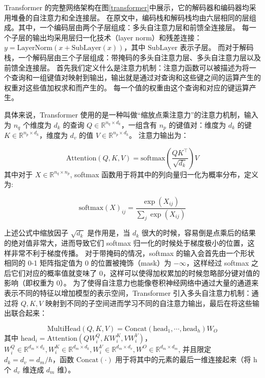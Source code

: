 Transformer 的完整网络架构在图\ref{transformer}中展示，它的解码器和编码器均采用堆叠的自注意力和全连接层。
在原文中，编码栈和解码栈均由六层相同的层组成。其中，一个编码层由两个子层组成：多头自注意力层和前馈全连接层。
每一个子层的输出均采用层归一化技术（layer norm）和残差连接：$y = \text{LayerNorm}(x + \text{SubLayer}(x))$，其中 $\text{SubLayer}$ 表示子层。
而对于解码栈，一个解码层由三个子层组成：带掩码的多头自注意力层、多头自注意力层以及前馈全连接层。
首先我们定义什么是注意力机制：注意力函数可以被描述为将一个查询和一组键值对映射到输出，输出就是通过对查询和这些键之间的运算产生的权重对这些值加权求和而产生的。
每一个值的权重由这个查询和对应的键运算产生。

具体来说，Transformer 使用的是一种叫做“缩放点乘注意力”的注意力机制，输入为 $n_q$ 个维度为 $d_k$ 的查询 $Q \in \mathbb{R}^{n_q \times d_k}$，一组含有 $n_p$ 的键值对：维度为 $d_k$ 的键 $K \in \mathbb{R}^{n_p \times d_k}$，维度为 $d_v$ 的值 $V \in \mathbb{R}^{n_p \times d_k}$。
注意力输出为：

\begin{equation}
	\text{Attention} (Q, K, V) = \text{softmax}(\frac{QK^\top}{\sqrt{d_k}}) V
\end{equation}
其中对于 $X \in \mathbb{R}^{n_q \times n_p}$, softmax 函数用于将其中的列向量归一化为概率分布，定义为:

\begin{equation}
	\text{softmax}(X)_{ij} = \frac{\exp(X_{ij})}{\sum_j \exp(X_{ij})}
\end{equation}

上述公式中缩放因子 $\sqrt{d_k}$ 是作用是，当 $d_k$ 很大的时候，容易倒是点乘后的结果的绝对值非常大，进而导致它们 softmax 归一化的时候处于梯度极小的位置，这样非常不利于梯度传播。
对于带掩码的情况，softmax 的输入会首先由一个形状相同的 0-1 矩阵指定值为 0 的位置被掩饰（mask）为 $-\infty$，这样经过 softmax 之后它们对应的概率值就变味了 $0$，这样可以使得加权累加的时候忽略部分键对值的影响（即权重为 0）。
为了使得自注意力也能像卷积神经网络中通过大量的通道来表示不同的特征以增加模型的表示空间，Transformer 引入多头自注意力机制：通过将 $Q,K,V$ 映射到不同的子空间进而学习不同的自注意力输出，最后在将这些输出联合起来：

\begin{equation}
	\text{MultiHead}(Q,K,V) = \text{Concat}(\text{head}_1,\cdots,\text{head}_h) W_O
\end{equation}
其中 $\text{head}_i = \text{Attention}(Q W_i^Q, KW_i^K, VW_i^V)$，$W_i^Q \in \mathbb{R}^{d_m \times d_k}, W_i^K \in \mathbb{R}^{d_m \times d_k}, W_i^V \in \mathbb{R}^{d_m \times d_v}, W^O \in \mathbb{R}^{d_m \times d_m}$, 并且限定 $d_k = d_v = d_m / h$，函数 $\text{Concat}(\cdot)$ 用于将其中的元素的最后一维连接起来（将 h 个 $d_v$ 维连成 $d_m$ 维）。

